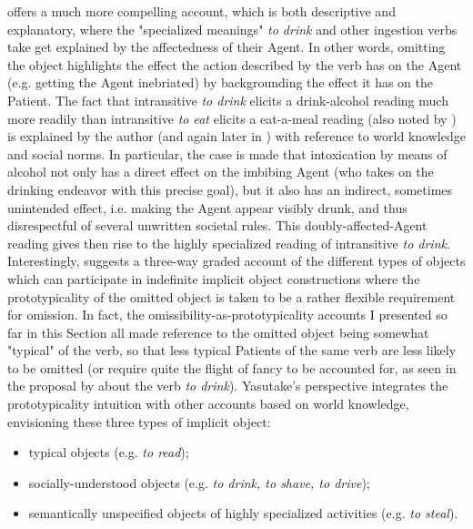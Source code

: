 \textcite[141]{Naess2007} offers a much more compelling account, which is both descriptive and explanatory, where the "specialized meanings" \textit{to drink} and other ingestion verbs take get explained by the affectedness of their Agent. In other words, omitting the object highlights the effect the action described by the verb has on the Agent (e.g. getting the Agent inebriated) by backgrounding the effect it has on the Patient. The fact that intransitive \textit{to drink} elicits a drink-alcohol reading much more readily than intransitive \textit{to eat} elicits a eat-a-meal reading (also noted by \textcite[14]{NewmanRice2006}) is explained by the author (and again later in \textcite[420]{Naess2011}) with reference to world knowledge and social norms. In particular, the case is made that intoxication by means of alcohol not only has a direct effect on the imbibing Agent (who takes on the drinking endeavor with this precise goal), but it also has an indirect, sometimes unintended effect, i.e. making the Agent appear visibly drunk, and thus disrespectful of several unwritten societal rules. This doubly-affected-Agent reading gives then rise to the highly specialized reading of intransitive \textit{to drink}.\\
Interestingly, \textcite[48-50]{Yasutake1987} suggests a three-way graded account of the different types of objects which can participate in indefinite implicit object constructions where the prototypicality of the omitted object is taken to be a rather flexible requirement for omission. In fact, the omissibility-as-prototypicality accounts I presented so far in this Section all made reference to the omitted object being somewhat "typical" of the verb, so that less typical Patients of the same verb are less likely to be omitted (or require quite the flight of fancy to be accounted for, as seen in the proposal by \textcite{HuddlestonEtAl2002} about the verb \textit{to drink}). Yasutake's perspective integrates the prototypicality intuition with other accounts based on world knowledge, envisioning these three types of implicit object:
\begin{itemize}
    \item typical objects (e.g. \textit{to read});
    \item socially-understood objects (e.g. \textit{to drink, to shave, to drive});
    \item semantically unspecified objects of highly specialized activities (e.g. \textit{to steal}).
\end{itemize}


